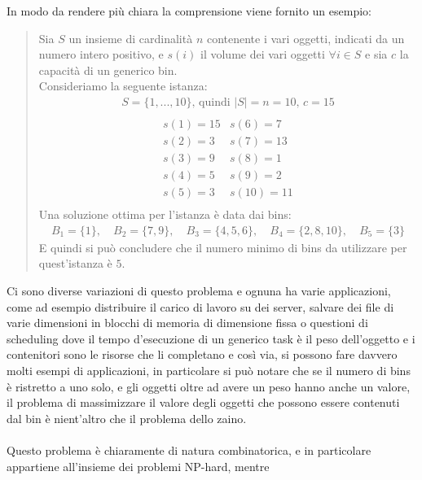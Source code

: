 \noindent
In modo da rendere più chiara la comprensione viene fornito un esempio:
\begin{quote}
	Sia $ S $ un insieme di cardinalità $ n $ contenente i vari oggetti, indicati da un numero intero positivo, e $ s(i) $
	il volume dei vari oggetti $ \forall i \in S $ e sia $ c $ la capacità di un generico bin. \\
	Consideriamo la seguente istanza:
	\begin{equation*}
		\begin{array}{c}
			S = \{1, ..., 10\} \text{, quindi } |S| = n = 10 \text{, } c = 15 \\
	    \end{array}
	\end{equation*}
	\begin{equation*}
	    \begin{array}{cc}
			s(1) = 15	&	s(6) = 7   \\
			s(2) = 3	&	s(7) = 13  \\
			s(3) = 9	&	s(8) = 1   \\
			s(4) = 5	&	s(9) = 2   \\
			s(5) = 3	&	s(10) = 11 \\
		\end{array}
	\end{equation*}
	Una soluzione ottima per l'istanza è data dai bins:
	\begin{align*}
		B_1 = \{1\} ,\quad B_2 = \{7, 9\} ,\quad B_3 = \{4, 5, 6\} ,\quad B_4 = \{2, 8, 10\} ,\quad B_5 = \{3\}
	\end{align*}
	E quindi si può concludere che il numero minimo di bins da utilizzare per quest'istanza è $ 5 $.
\end{quote}
Ci sono diverse variazioni di questo problema e ognuna ha varie applicazioni, come ad esempio distribuire il carico di
lavoro su dei server, salvare dei file di varie dimensioni in blocchi di memoria di dimensione fissa o questioni di
scheduling dove il tempo d'esecuzione di un generico task è il peso dell'oggetto e i contenitori sono le risorse che li
completano e così via, si possono fare davvero molti esempi di applicazioni, in particolare si può notare che se il numero
di bins è ristretto a uno solo, e gli oggetti oltre ad avere un peso hanno anche un valore, il problema di massimizzare il
valore degli oggetti che possono essere contenuti dal bin è nient'altro che il problema dello zaino. \\ \\
Questo problema è chiaramente di natura combinatorica, e in particolare appartiene all'insieme dei problemi NP-hard, mentre
